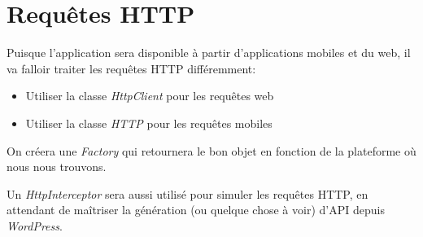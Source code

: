 \documentclass[french]{report}
\begin{document}
\section{Requêtes HTTP}
Puisque l'application sera disponible à partir d'applications mobiles et du web,
il va falloir traiter les requêtes HTTP différemment:
\begin{itemize}
    \item Utiliser la classe \textit{HttpClient} pour les requêtes web
    \item Utiliser la classe \textit{HTTP} pour les requêtes mobiles
\end{itemize}
On créera une \textit{Factory} qui retournera le bon objet en fonction de la
plateforme où nous nous trouvons.

Un \textit{HttpInterceptor} sera aussi utilisé pour simuler les requêtes HTTP,
en attendant de maîtriser la génération (ou quelque chose à voir) d'API depuis
\textit{WordPress}.
\end{document}
